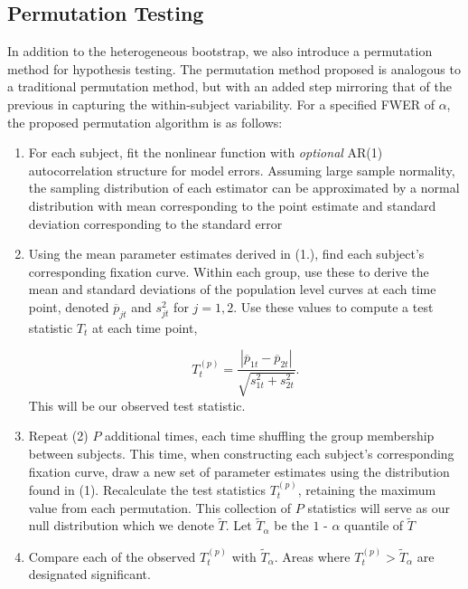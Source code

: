 

\subsection{Permutation Testing}

In addition to the heterogeneous bootstrap, we also introduce a permutation method for hypothesis testing. The permutation method proposed is analogous to a traditional permutation method, but with an added step mirroring that of the previous in capturing the within-subject variability. For a specified FWER of $\alpha$, the proposed permutation algorithm is as follows:


\begin{enumerate}
\vspace{-2mm}
\item For each subject, fit the nonlinear function with \textit{optional} AR(1) autocorrelation structure for model errors. Assuming large sample normality, the sampling distribution of each estimator can be approximated by a normal distribution with mean corresponding to the point estimate and standard deviation corresponding to the standard error
\item Using the mean parameter estimates derived in (1.), find each subject's corresponding fixation curve. Within each group, use these to derive the mean and standard deviations of the population level curves at each time point, denoted $\overline{p}_{jt}$ and $s_{jt}^2$ for $j = 1,2$. Use these values to compute a test statistic $T_t$ at each time point,

\begin{equation}
T_t^{(p)} = \frac{|\overline{p}_{1t} - \overline{p}_{2t}|}{\sqrt{s_{1t}^2 + s_{2t}^2}}.
\end{equation}
This will be our observed test statistic.
\item Repeat (2) $P$  additional times, each time shuffling the group membership between subjects. This time, when constructing each subject's corresponding fixation curve, draw a new set of parameter estimates using the distribution found in (1). Recalculate the test statistics $T_t^{(p)}$, retaining the maximum value from each permutation. This collection of $P$ statistics will serve as our null distribution which we denote $\widetilde{T}$. Let $\widetilde{T}_{\alpha}$ be the $1$ - $\alpha$ quantile of $\widetilde{T}$
\item Compare each of the observed $T_t^{(p)}$ with $\widetilde{T}_{\alpha}$. Areas where $T_t^{(p)} > \widetilde{T}_{\alpha}$ are designated significant. 
\end{enumerate}

